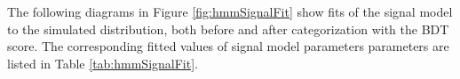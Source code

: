The following diagrams in Figure \ref{fig:hmmSignalFit} show fits of the signal model to the simulated distribution, both before and after categorization with the BDT score.
The corresponding fitted values of signal model parameters parameters are listed in Table \ref{tab:hmmSignalFit}.



